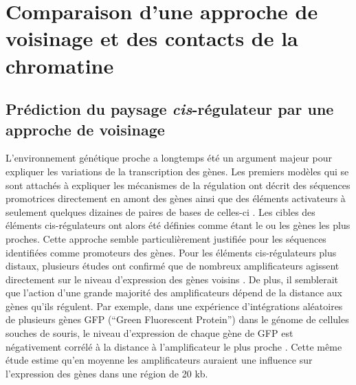 \chapter{Comparaison d'une approche de voisinage et des contacts de la chromatine}
{\hypersetup{linkcolor=GREYDARK}\minitoc}
\label{chap:comp-voisinage}

\section{Prédiction du paysage \textit{cis}-régulateur par une approche de voisinage}
\label{sec:prediction-voisinage}

L’environnement génétique proche a longtemps été un argument majeur pour expliquer les variations de la transcription des gènes. Les premiers modèles qui se sont attachés à expliquer les mécanismes de la régulation ont décrit des séquences promotrices directement en amont des gènes ainsi que des éléments activateurs à seulement quelques dizaines de paires de bases de celles-ci \citep{britten_gene_1969, ptashne_transcriptional_1997}. Les cibles des éléments \gls{cis}-régulateurs ont alors été définies comme étant le ou les gènes les plus proches. Cette approche semble particulièrement justifiée pour les séquences identifiées comme promoteurs des gènes. Pour les éléments \gls{cis}-régulateurs plus distaux, plusieurs études ont confirmé que de nombreux \glspl{amplificateur} agissent directement sur le niveau d’expression des gènes voisins \citep{banerji_expression_1981, dimattia_pit-1_1997}. De plus, il semblerait que l’action d’une grande majorité des \glspl{amplificateur} dépend de la distance aux gènes qu’ils régulent. Par exemple, dans une expérience d’intégrations aléatoires de plusieurs gènes \acrshort{GFP} (“Green Fluorescent Protein”) dans le génome de cellules souches de souris, le niveau d’expression de chaque gène de \acrshort{GFP} est négativement corrélé à la distance à l’\gls{amplificateur} le plus proche \citep{akhtar_chromatin_2013}. Cette même étude estime qu’en moyenne les \glspl{amplificateur} auraient une influence sur l’expression des gènes dans une région de 20 kb.\\


